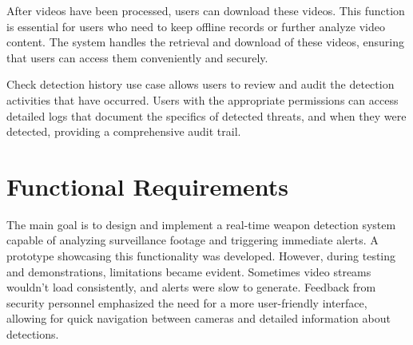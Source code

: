 After videos have been processed, users can download these videos. This function is essential for users who need to 
keep offline records or further analyze video content. The system handles the retrieval and download of these videos, 
ensuring that users can access them conveniently and securely.

Check detection history use case allows users to review and audit the detection activities that have occurred. 
Users with the appropriate permissions can access detailed 
logs that document the specifics of detected threats, and when they were detected, providing a 
comprehensive audit trail.






\section{Functional Requirements}
The main goal is to design and implement a real-time weapon detection system capable of 
analyzing surveillance footage and triggering immediate alerts. A prototype showcasing this functionality was developed. 
However, during testing and demonstrations, limitations became evident. Sometimes video streams wouldn't load consistently, 
and alerts were slow to generate. Feedback from security personnel emphasized the need for a more user-friendly 
interface, allowing for quick navigation between cameras and detailed information about detections.

